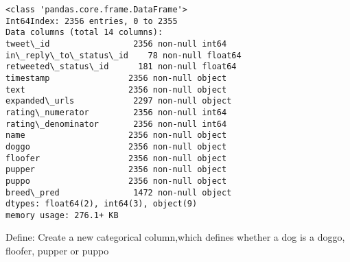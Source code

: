 \documentclass[11pt]{article}
\begin{document}
    \begin{Verbatim}[commandchars=\\\{\}]
<class 'pandas.core.frame.DataFrame'>
Int64Index: 2356 entries, 0 to 2355
Data columns (total 14 columns):
tweet\_id                 2356 non-null int64
in\_reply\_to\_status\_id    78 non-null float64
retweeted\_status\_id      181 non-null float64
timestamp                2356 non-null object
text                     2356 non-null object
expanded\_urls            2297 non-null object
rating\_numerator         2356 non-null int64
rating\_denominator       2356 non-null int64
name                     2356 non-null object
doggo                    2356 non-null object
floofer                  2356 non-null object
pupper                   2356 non-null object
puppo                    2356 non-null object
breed\_pred               1472 non-null object
dtypes: float64(2), int64(3), object(9)
memory usage: 276.1+ KB

    \end{Verbatim}

    Define: Create a new categorical column,which defines whether a dog is a
doggo, floofer, pupper or puppo
\end{document}
